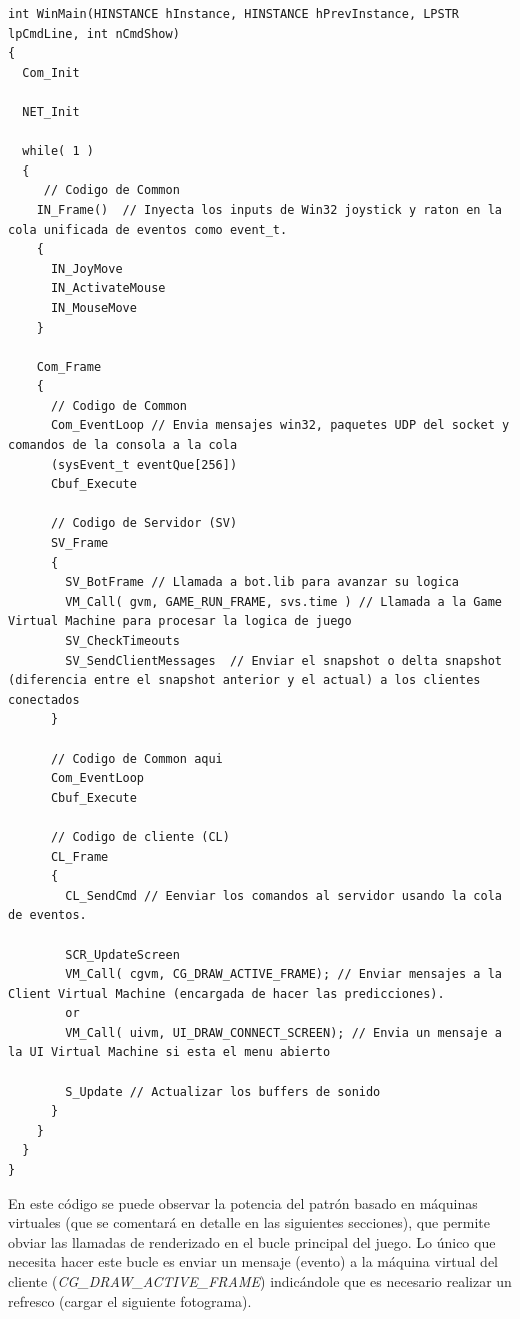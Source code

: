 \documentclass[a4paper,12pt]{report}
\begin{document}
	\begin{lstlisting}[style=C, numbers=none]
int WinMain(HINSTANCE hInstance, HINSTANCE hPrevInstance, LPSTR lpCmdLine, int nCmdShow)
{
  Com_Init
	
  NET_Init
	
  while( 1 )
  {
     // Codigo de Common 
    IN_Frame()  // Inyecta los inputs de Win32 joystick y raton en la cola unificada de eventos como event_t.
    {
      IN_JoyMove
      IN_ActivateMouse
      IN_MouseMove
    }
    
    Com_Frame
    {
      // Codigo de Common 
      Com_EventLoop // Envia mensajes win32, paquetes UDP del socket y comandos de la consola a la cola
      (sysEvent_t eventQue[256])
      Cbuf_Execute
      
      // Codigo de Servidor (SV)
      SV_Frame
      {
        SV_BotFrame // Llamada a bot.lib para avanzar su logica
        VM_Call( gvm, GAME_RUN_FRAME, svs.time ) // Llamada a la Game Virtual Machine para procesar la logica de juego
        SV_CheckTimeouts
        SV_SendClientMessages  // Enviar el snapshot o delta snapshot (diferencia entre el snapshot anterior y el actual) a los clientes conectados
      } 
      
      // Codigo de Common aqui
      Com_EventLoop
      Cbuf_Execute
      
      // Codigo de cliente (CL)
      CL_Frame
      {
        CL_SendCmd // Eenviar los comandos al servidor usando la cola de eventos.
        
        SCR_UpdateScreen
        VM_Call( cgvm, CG_DRAW_ACTIVE_FRAME); // Enviar mensajes a la Client Virtual Machine (encargada de hacer las predicciones).
        or
        VM_Call( uivm, UI_DRAW_CONNECT_SCREEN); // Envia un mensaje a la UI Virtual Machine si esta el menu abierto
        
        S_Update // Actualizar los buffers de sonido
      }
    }
  }
}
	\end{lstlisting}

    En este código se puede observar la potencia del patrón basado en máquinas virtuales (que se comentará en detalle en las siguientes secciones), que permite obviar las llamadas de renderizado en el bucle principal del juego. Lo único que necesita hacer este bucle es enviar un mensaje (evento) a la máquina virtual del cliente (\textit{CG\_DRAW\_ACTIVE\_FRAME}) indicándole que es necesario realizar un refresco (cargar el siguiente fotograma).\\
    
\end{document}
